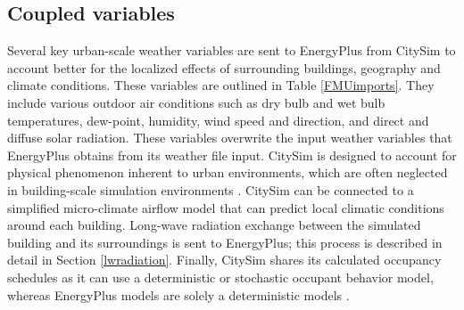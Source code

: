 \documentclass{tBPS2e}
\theoremstyle{plain}
\theoremstyle{definition}
\theoremstyle{remark}
\begin{document}
\subsection{Coupled variables}
Several key urban-scale weather variables are sent to EnergyPlus from CitySim
to account better for the localized effects of surrounding buildings,
geography and climate conditions. These variables are outlined in Table \ref{FMUimports}. 
They include various outdoor air
conditions such as dry bulb and wet bulb temperatures, dew-point, humidity, wind
speed and direction, and direct and diffuse solar radiation. These variables
overwrite the input weather variables that EnergyPlus obtains from its weather
file input. CitySim is designed to account for physical phenomenon inherent to
urban environments, which are often neglected in building-scale simulation
environments \citep{robinson_solar_2004,robinson_citysim:_2009}. CitySim can be connected 
to a simplified micro-climate airflow model that can predict local climatic conditions 
around each building. Long-wave radiation exchange between the simulated building and its surroundings is sent to
EnergyPlus; this process is described in detail in Section \ref{lwradiation}.
Finally, CitySim shares its calculated occupancy schedules as it can use a deterministic 
or stochastic occupant behavior model, whereas EnergyPlus models are solely a deterministic models \citep{haldi_impact_2011}.
\end{document}
